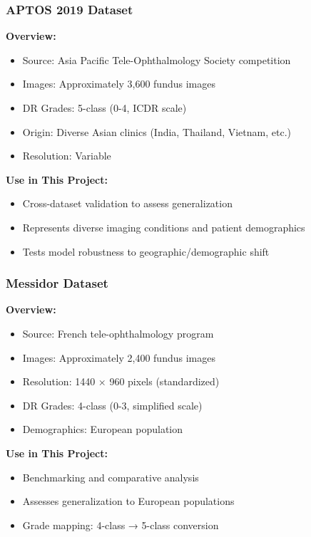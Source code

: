 \documentclass[12pt,a4paper]{article}
\begin{document}
\subsubsection{APTOS 2019 Dataset}

\textbf{Overview:}
\begin{itemize}
    \item Source: Asia Pacific Tele-Ophthalmology Society competition
    \item Images: Approximately 3,600 fundus images
    \item DR Grades: 5-class (0-4, ICDR scale)
    \item Origin: Diverse Asian clinics (India, Thailand, Vietnam, etc.)
    \item Resolution: Variable
\end{itemize}

\textbf{Use in This Project:}
\begin{itemize}
    \item Cross-dataset validation to assess generalization
    \item Represents diverse imaging conditions and patient demographics
    \item Tests model robustness to geographic/demographic shift
\end{itemize}

\subsubsection{Messidor Dataset}

\textbf{Overview:}
\begin{itemize}
    \item Source: French tele-ophthalmology program
    \item Images: Approximately 2,400 fundus images
    \item Resolution: 1440 × 960 pixels (standardized)
    \item DR Grades: 4-class (0-3, simplified scale)
    \item Demographics: European population
\end{itemize}

\textbf{Use in This Project:}
\begin{itemize}
    \item Benchmarking and comparative analysis
    \item Assesses generalization to European populations
    \item Grade mapping: 4-class → 5-class conversion
\end{itemize}
\end{document}
